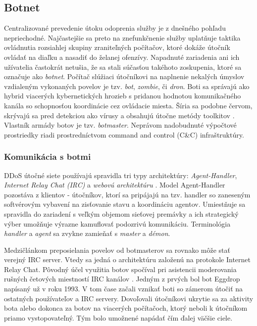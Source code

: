 \documentclass[12pt, a4paper]{article}
\begin{document}
\subsection{Botnet}
Centralizované prevedenie útoku odoprenia služby je z dnešného pohľadu nepriechodné. Najčastejšie sa preto 
na znefunkčnenie služby uplatňuje taktika ovládnutia rozsiahlej skupiny zraniteľných počítačov, ktoré dokáže 
útočník ovládať na diaľku a nasadiť do želanej ofenzívy. Napadnuté zariadenia ani ich užívatelia 
častokrát netušia, že sa stali súčasťou takéhoto zoskupenia, ktoré sa označuje ako \emph{botnet}. 
Počítač slúžiaci útočníkovi na naplnenie nekalých úmyslov vzdialeným vykonaných povelov je tzv. \emph{bot}, 
\emph{zombie}, či \emph{dron}. Boti sa správajú ako hybrid viacerých kybernetických hrozieb s pridanou 
hodnotou komunikačného  kanála so schopnosťou koordinácie cez ovládacie miesta. Šíria sa podobne červom, 
skrývajú sa pred detekciou ako vírusy a obsahujú útočne metódy toolkitov \cite{zombie-roundup}. Vlastník 
armády botov je tzv. \emph{botmaster}. Neprávom nadobudnuté výpočtové prostriedky riadi prostredníctvom 
command and control (C\&C) infraštruktúry.

\subsubsection{Komunikácia s botmi}
DDoS útočné siete používajú spravidla tri typy architektúry: \emph{Agent-Handler}, \emph{Internet Relay Chat 
(IRC)} a \emph{webovú architektúru} \cite{ddos-attacks} \cite{botnets}. Model Agent-Handler pozostáva z 
klientov - útočníkov, ktorí sa pripájajú na tzv. handler so zaneseným softvérovým vybavení na zisťovanie 
stavu a koordináciu agentov. Umiestňuje sa spravidla do zariadení s veľkým objemom sieťovej premávky a ich 
strategický výber umožňuje výrazne kamuflovať podozrivú komunikáciu. Terminológia \emph{handler} a 
\emph{agent} sa zvykne zamieňať s \emph{master} a \emph{démon}. 

Medzičlánkom preposielania povelov od botmasterov sa rovnako môže stať verejný IRC server. Vtedy sa jedná o 
architektúru založenú na protokole Internet Relay Chat. Pôvodný účel využitia botov spočíval pri
asistencii moderovania rušných četových miestností IRC kanálov \cite{zombie-roundup}. Jedným z prvých bol 
bot Eggdrop napísaný už v roku 1993. V tom čase začali vznikať boti so zámerom útočiť na ostatných 
používateľov a IRC servery. Dovoľovali útočníkovi ukrytie sa za aktivity bota alebo dokonca za botov na 
viacerých počítačoch, ktorý neboli k útočníkom priamo vystopovateľný. Tým bolo umožnené napádať čím ďalej 
väčšie ciele. 
\end{document}
